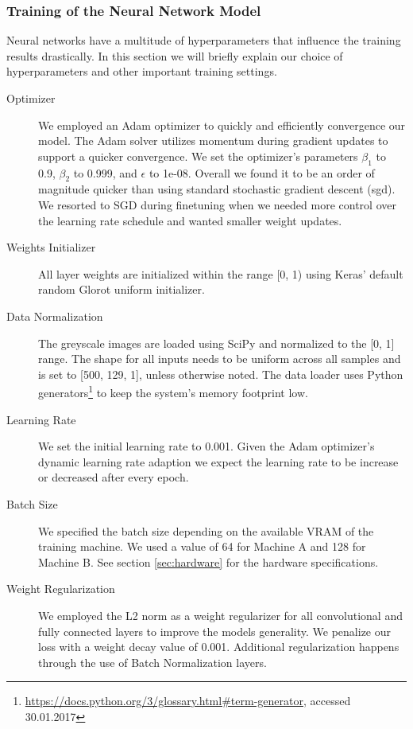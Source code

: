 \subsubsection{Training of the Neural Network Model} 
\label{sec:training}
Neural networks have a multitude of hyperparameters that influence the training results drastically. In this section we will briefly explain our choice of hyperparameters and other important training settings.

	\begin{description}
	\item[Optimizer] We employed an Adam\cite{kingma2014adam} optimizer to quickly and efficiently convergence our model. The Adam solver utilizes momentum during gradient updates to support a quicker convergence. We set the optimizer's parameters $\beta_1$ to 0.9, $\beta_2$ to 0.999, and $\epsilon$ to 1e-08. Overall we found it to be an order of magnitude quicker than using standard stochastic gradient descent (\ac{sgd}). We resorted to SGD during finetuning when we needed more control over the learning rate schedule and wanted smaller weight updates.
	\item[Weights Initializer] All layer weights are initialized within the range [0, 1) using Keras' default random Glorot uniform initializer\cite{glorot2010understanding}.
	\item[Data Normalization] The greyscale images are loaded using SciPy and normalized to the [0, 1] range. The shape for all inputs needs to be uniform across all samples and is set to [500, 129, 1], unless otherwise noted. The data loader uses Python generators\footnote{\url{https://docs.python.org/3/glossary.html#term-generator}, accessed 30.01.2017} to keep the system's memory footprint low.
	\item[Learning Rate] We set the initial learning rate to 0.001. Given the Adam optimizer's dynamic learning rate adaption we expect the learning rate to be increase or decreased after every epoch. 
	\item[Batch Size] We specified the batch size depending on the available VRAM of the training machine. We used a value of 64 for Machine A and 128 for Machine B. See section \ref{sec:hardware} for the hardware specifications. 
	\item[Weight Regularization] We employed the L2 norm as a weight regularizer for all convolutional and fully connected layers to improve the models generality. We penalize our loss with a weight decay value of 0.001. Additional regularization happens through the use of Batch Normalization layers.

\end{description}
